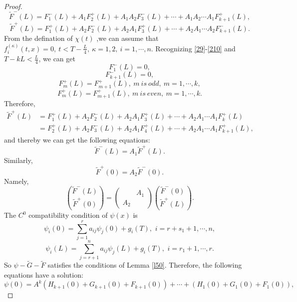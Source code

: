 \documentclass[a4paper,reqno,11pt]{amsart}
\numberwithin{equation}{section} %
\begin{document}
\begin{proof}
$$
\tilde{F}^-  (L) =F^- _1 (L) +A_1 F^+ _2 (L) +A_1 A_2 F^- _3 (L)  +\cdots +A_1 A_2 \cdots A_1 F^+ _{k+1} (L) ,
$$
$$
\tilde{F}^+  (L) =F^+ _1 (L) +A_2 F^- _2 (L) +A_2 A_1 F^+ _3 (L)  +\cdots +A_2 A_1 \cdots A_2 F^- _{k+1} (L) .
$$
From the defination of $\chi (t)$ ,we can assume that $f^{(\kappa)}_i(t,x)=0,\ t < T-\frac{L}{4},\ \kappa=1,2,\ i=1,\cdots,n$. Recognizing \eqref{29}-\eqref{210} and $T-kL < \frac{L}{4}$, we can get 
$$
F^- _{1}(L)=0,
$$
$$
F^- _{k+1}(L)=0,
$$
$$
F^+ _{m}(L) =F^+ _{m+1}(L) ,\ m\ is\ odd ,\ m=1,\cdots ,k,
$$
$$
F^+ _{m}(L) =F^+ _{m+1}(L) ,\ m\ is\ even ,\ m=1,\cdots ,k.
$$
Therefore,
\begin{equation}
	\begin{aligned}
		\tilde{F}^+  (L) &=F^+ _1 (L) +A_2 F^- _2 (L) +A_2 A_1 F^+ _3 (L)  +\cdots +A_2 A_1 \cdots A_1 F^+ _{k} (L) \\
		                 &=F^+ _2 (L) +A_2 F^- _3 (L) +A_2 A_1 F^+ _4 (L)  +\cdots +A_2 A_1 \cdots A_1 F^+ _{k+1} (L) ,
	\end{aligned}
\end{equation}
and thereby we can get the following equations:
$$
\tilde{F}^-  (L) =A_1 \tilde{F} ^+  (L) .
$$
Similarly,
$$
\tilde{F}^+  (0) =A_2 \tilde{F} ^-  (0) .
$$
Namely, 
\begin{equation}\label{compatibility condition of F}
    \binom{\tilde{F} ^{-}(L)}{\tilde{F}^{+}(0)}=\left(\begin{array}{ll} 
        & A_1 \\
        A_2 &
    \end{array}\right)\binom{\tilde{F}^{-}(0)}{\tilde{F} ^{+}(L)}.
\end{equation}
The $C^0$ compatibility condition of $\psi(x)$ is
\begin{equation}\label{21}
    \psi _i\left( 0 \right) =\sum_{j=1}^r{a_{ij}\psi _j\left( 0 \right) + g_i(T),\,\,i=r+s_1+1,\cdots ,n},
\end{equation}
\begin{equation}\label{22}
    \psi _i\left( L \right) =\sum_{j=r+1}^n{a_{ij}\psi _j\left( L \right) +g_i(T),\,\,i=r_1+1,\cdots ,r}.
\end{equation}
So $\psi -\tilde{G} -\tilde{F} $ satisfies the conditions of Lemma \ref{l50}. Therefore, the following equations have a solution:
\begin{equation}\label{c0 continuity at 0}
\psi\left( 0 \right) =A^k\left( H_{k+1}\left( 0 \right) +G_{k+1}\left( 0 \right)+F_{k+1}\left( 0 \right) \right)  +\cdots +\left( H_1\left( 0 \right) +G_1\left( 0 \right)+F_1\left( 0 \right) \right) ,

\end{equation}
\end{proof}
\end{document}
